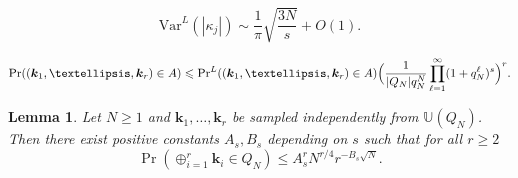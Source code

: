 \documentclass[10pt,a4paper]{amsart}
\newtheorem{lemma}{Lemma}
\newcommand{\bsk}{\boldsymbol{k}}
\newcommand{\dunif}{\mathbb{U}}
\renewcommand{\geq}{\geqslant}
\renewcommand{\leq}{\leqslant}
\newcommand{\var}{\mathrm{Var}}
\begin{document}
    \begin{equation}\label{eqn:varLasym}
        \var^L(|\kappa_j|)\sim \frac{1}{\pi}\sqrt{\frac{3 N}{s}}+O(1).
    \end{equation}

\begin{equation}\label{eqn:rversionPrlePrL}
    \Pr((\bsk_1,\dots,\bsk_r)\in A)\leq {\textstyle\Pr}^L((\bsk_1,\dots,\bsk_r)\in A)\Bigl(\frac{1}{|Q_N|q_N^N}\prod_{\ell=1}^\infty (1+q_N^\ell)^s\Bigr)^r.
\end{equation}

\begin{lemma}\label{lem:sumk}
Let $N\geq 1$ and $\bsk_1,\dots,\bsk_r$ be sampled independently from $\dunif (Q_N)$. Then there exist positive constants $A_s, B_s$ depending on $s$ such that for all $r\geq 2$
\begin{equation*}
    \Pr\left(\oplus_{i=1}^r\bsk_i\in Q_N\right)\leq A^r_s N^{r/4} r^{-B_s\sqrt{N}}.
\end{equation*}
\end{lemma}
\end{document}
